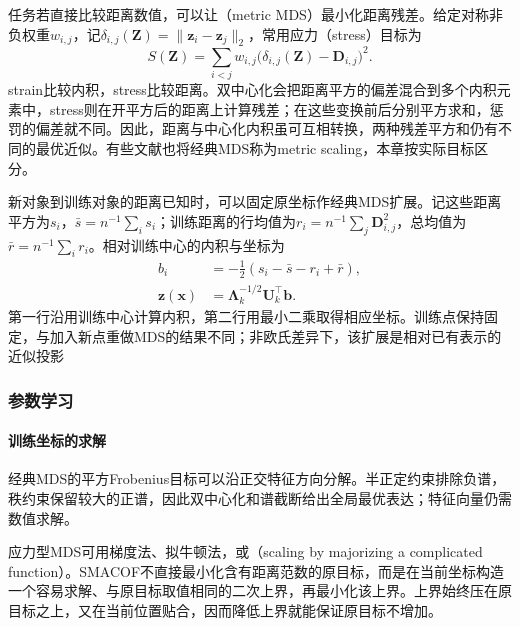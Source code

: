 任务若直接比较距离数值，可以让（metric MDS）最小化距离残差。给定对称非负权重$w_{i,j}$，记$\delta_{i,j}(\bm{Z})=\lVert\bm{z}_i-\bm{z}_j\rVert_2$，常用应力（stress）目标为
\begin{equation}
  \label{eq:dim-mds-stress}
  S(\bm{Z})
  =\sum_{i<j}w_{i,j}
    \bigl(\delta_{i,j}(\bm{Z})-\bm{D}_{i,j}\bigr)^2.
\end{equation}
strain比较内积，stress比较距离。双中心化会把距离平方的偏差混合到多个内积元素中，stress则在开平方后的距离上计算残差；在这些变换前后分别平方求和，惩罚的偏差就不同。因此，距离与中心化内积虽可互相转换，两种残差平方和仍有不同的最优近似。有些文献也将经典MDS称为metric scaling，本章按实际目标区分。

新对象到训练对象的距离已知时，可以固定原坐标作经典MDS扩展。记这些距离平方为$s_i$，$\bar s=n^{-1}\sum_i s_i$；训练距离的行均值为$r_i=n^{-1}\sum_j\bm{D}_{i,j}^2$，总均值为$\bar r=n^{-1}\sum_i r_i$。相对训练中心的内积与坐标为
\begin{equation}
  \label{eq:dim-mds-extension}
  \begin{aligned}
    b_i&=-\frac12(s_i-\bar s-r_i+\bar r),\\
    \bm{z}(\bm{x})
      &=\bm{\Lambda}_k^{-1/2}\bm{U}_k^{\top}\bm{b}.
  \end{aligned}
\end{equation}
第一行沿用训练中心计算内积，第二行用最小二乘取得相应坐标。训练点保持固定，与加入新点重做MDS的结果不同；非欧氏差异下，该扩展是相对已有表示的近似投影

\subsubsection{参数学习}

\paragraph{训练坐标的求解}

经典MDS的平方Frobenius目标可以沿正交特征方向分解。半正定约束排除负谱，秩约束保留较大的正谱，因此双中心化和谱截断给出全局最优表达；特征向量仍需数值求解。

应力型MDS可用梯度法、拟牛顿法，或（scaling by majorizing a complicated function）。SMACOF不直接最小化含有距离范数的原目标，而是在当前坐标构造一个容易求解、与原目标取值相同的二次上界，再最小化该上界。上界始终压在原目标之上，又在当前位置贴合，因而降低上界就能保证原目标不增加。

